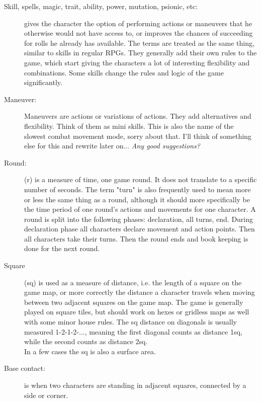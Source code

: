 \begin{description}
\item[Skill, spells, magic, trait, ability, power, mutation, psionic, etc:] gives the character the option of performing actions or maneuvers that he otherwise would not have access to, or improves the chances of succeeding for rolls he already has available. The terms are treated as the same thing, similar to skills in regular RPGs. They generally add their own rules to the game, which start giving the characters a lot of interesting flexibility and combinations. Some skills change the rules and logic of the game significantly.

\item[Maneuver:] Maneuvers are actions or variations of actions. They add alternatives and flexibility. Think of them as mini skills.
This is also the name of the slowest combat movement mode, sorry about that. I'll think of something else for this and rewrite later on... \emph{Any good suggestions?}

\item[Round:] (r) is a measure of time, one game round. It does not translate to a specific number of seconds. The term "turn" is also frequently used to mean more or less the same thing as a round, although it should more specifically be the time period of one round's actions and movements for one character.
A round is split into the following phases: declaration, all turns, end.
During declaration phase all characters declare movement and action points. Then all characters take their turns. Then the round ends and book keeping is done for the next round.

\item[Square] (sq) is used as a measure of distance, i.e. the length of a square on the game map, or more correctly the distance a character travels when moving between two adjacent squares on the game map. The game is generally played on square tiles, but should work on hexes or gridless maps as well with some minor house rules.
The sq distance on diagonals is usually measured 1-2-1-2-..., meaning the first diagonal counts as distance 1sq, while the second counts as distance 2sq.\\
In a few cases the sq is also a surface area.

\item[Base contact:] is when two characters are standing in adjacent squares, connected by a side or corner.

\end{description}









